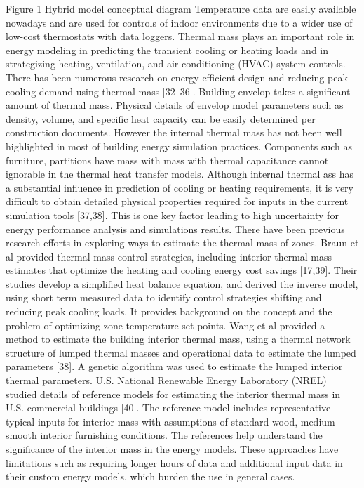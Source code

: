 Figure 1 Hybrid model conceptual diagram
Temperature data are easily available nowadays and are used for controls of indoor environments due to a wider use of low-cost thermostats with data loggers. Thermal mass plays an important role in energy modeling in predicting the transient cooling or heating loads and in strategizing heating, ventilation, and air conditioning (HVAC) system controls. There has been numerous research on energy efficient design and reducing peak cooling demand using thermal mass  [32–36]. Building envelop takes a significant amount of thermal mass. Physical details of envelop model parameters such as density, volume, and specific heat capacity can be easily determined per construction documents. However the internal thermal mass has not been well highlighted in most of building energy simulation practices. Components such as furniture, partitions have mass with mass with thermal capacitance cannot ignorable in the thermal heat transfer models. Although internal thermal ass has a substantial influence in prediction of cooling or heating requirements, it is very difficult to obtain detailed physical properties required for inputs in the current simulation tools [37,38]. This is one key factor leading to high uncertainty for energy performance analysis and simulations results.
There have been previous research efforts in exploring ways to estimate the thermal mass of zones. Braun et al provided thermal mass control strategies, including interior thermal mass estimates that optimize the heating and cooling energy cost savings [17,39]. Their studies develop a simplified heat balance equation, and derived the inverse model, using short term measured data to identify control strategies shifting and reducing peak cooling loads. It provides background on the concept and the problem of optimizing zone temperature set-points. Wang et al provided a method to estimate the building interior thermal mass, using a thermal network structure of lumped thermal masses and operational data to estimate the lumped parameters [38]. A genetic algorithm was used to estimate the lumped interior thermal parameters. U.S. National Renewable Energy Laboratory (NREL) studied details of reference models for estimating the interior thermal mass in U.S. commercial buildings [40]. The reference model includes representative typical inputs for interior mass with assumptions of standard wood, medium smooth interior furnishing conditions. The references help understand the significance of the interior mass in the energy models. These approaches have limitations such as requiring longer hours of data and additional input data in their custom energy models, which burden the use in general cases. 
